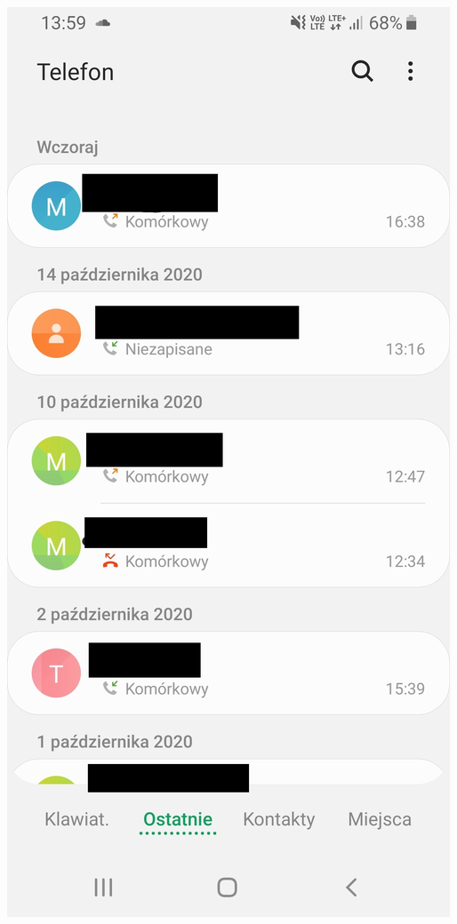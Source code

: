 \documentclass{article}
\begin{document}
\begin{center}
    \includegraphics[scale=0.15]{Kontakty.jpg}
\end{center}
\end{document}
